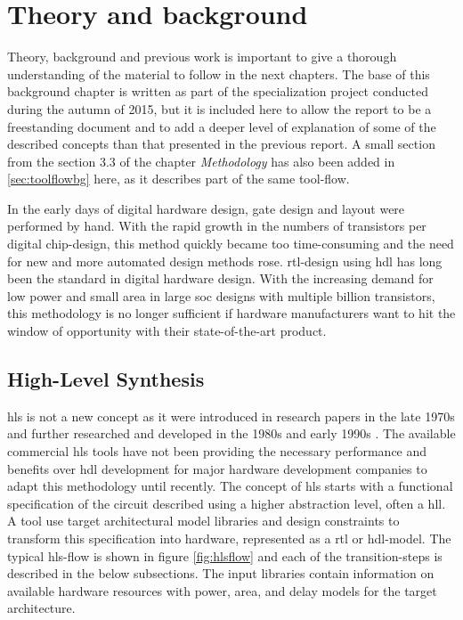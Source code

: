 \chapter{\label{chp:background}Theory and background}
Theory, background and previous work is important to give a thorough understanding of the material to follow in the next chapters. The base of this background chapter is written as part of the specialization project conducted during the autumn of 2015, but it is included here to allow the report to be a freestanding document and to add a deeper level of explanation of some of the described concepts than that presented in the previous report. A small section from the section 3.3 of the chapter \textit{Methodology} has also been added in \cref{sec:toolflowbg} here, as it describes part of the same tool-flow.

In the early days of digital hardware design, gate design and layout were performed by hand. With the rapid growth in the numbers of transistors per digital chip-design, this method quickly became too time-consuming and the need for new and more automated design methods rose. \gls{rtl}-design using \gls{hdl} has long been the standard in digital hardware design. With the increasing demand for low power and small area in large \gls{soc} designs with multiple billion transistors, this methodology is no longer sufficient if hardware manufacturers want to hit the window of opportunity with their state-of-the-art product.

\section{\label{sec:hls}High-Level Synthesis}

\gls{hls} is not a new concept as it were introduced in research papers in the late 1970s and further researched and developed in the 1980s and early 1990s \cite{martin2009high}. The available commercial \gls{hls} tools have not been providing the necessary performance and benefits over \gls{hdl} development for major hardware development companies to adapt this methodology until recently.
The concept of \gls{hls} starts with a functional specification of the circuit described using a higher abstraction level, often a \gls{hll}. A tool use target architectural model libraries and design constraints to transform this specification into hardware, represented as a \gls{rtl} or \gls{hdl}-model. The typical \gls{hls}-flow is shown in figure \ref{fig:hlsflow} and each of the transition-steps is described in the below subsections. The input libraries contain information on available hardware resources with power, area, and delay models for the target architecture.

